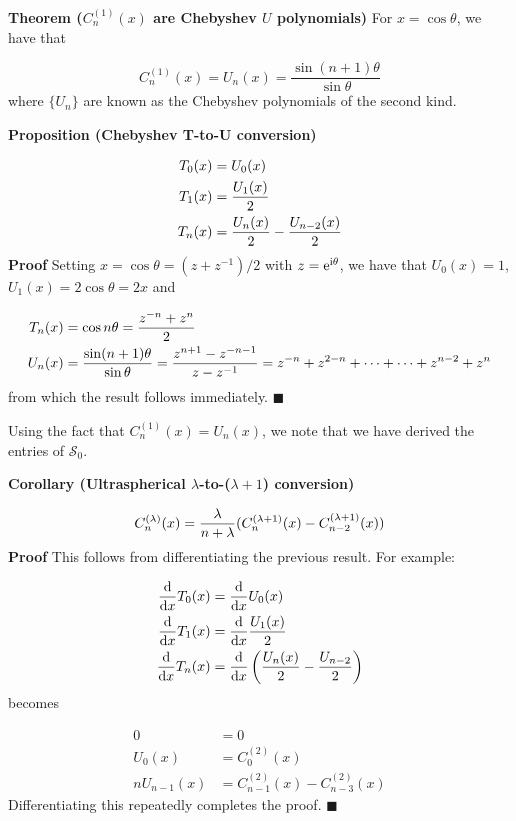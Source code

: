 \documentclass[12pt,landscape]{article}
\begin{document}
{\textbf{Theorem ($C^{(1)}_n(x)$ are Chebyshev $U$ polynomials)} For $x = \cos \theta$, we have that

\[
C_n^{(1)}(x) = U_n(x) = \frac{\sin (n+1)\theta}{\sin\theta}
\]
where $\{ U_n \}$ are known as the Chebyshev polynomials of the second kind.

\textbf{Proposition (Chebyshev T-to-U conversion)}


\begin{align*}
 T_0(x) &= U_0(x) \\
 T_1(x) &= {U_1(x) \over 2} \\
 T_n(x) &= {U_n(x) \over 2} - {U_{n-2}(x) \over 2}
\end{align*}
\textbf{Proof} Setting $x =\cos \theta = (z + z^{-1})/2$ with $z = {\rm e}^{{\rm i} \theta}$, we have that $U_0(x) = 1$, $U_1(x) = 2\cos\theta = 2x$ and


\begin{align*}
T_n(x) &= \cos n \theta = {z^{-n} + z^n \over 2}\\
U_n(x) &= {\sin (n+1) \theta \over \sin \theta} = {z^{n+1} - z^{-n-1} \over z - z^{-1}} = z^{-n} + z^{2-n} + \cdots +  \cdots + z^{n-2} + z^n
\end{align*}
from which the result follows immediately.  $\blacksquare$

Using the fact that $C_n^{(1)}(x) = U_n(x)$, we note that we have derived the entries of $\mathcal{S}_0$.

\textbf{Corollary (Ultraspherical $\lambda$-to-($\lambda+1$) conversion)}

\[
C_n^{(\lambda)}(x) = {\lambda \over n+ \lambda} (C_n^{(\lambda+1)}(x) - C_{n-2}^{(\lambda+1)}(x))
\]
\textbf{Proof} This follows from differentiating the previous result. For example:


\begin{align*}
 {{\rm d} \over {\rm d}x} T_0(x) &= {{\rm d} \over {\rm d}x} U_0(x) \\
 {{\rm d} \over {\rm d}x} T_1(x) &= {{\rm d} \over {\rm d}x} {U_1(x) \over 2} \\
{{\rm d} \over {\rm d}x} T_n(x) &= {{\rm d} \over {\rm d}x} \left({U_n(x) \over 2} - {U_{n-2} \over 2} \right)
\end{align*}
becomes


\begin{align*}
    0 &= 0\\
    U_0(x) &= C_0^{(2)}(x) \\
   n U_{n-1}(x) &= C_{n-1}^{(2)}(x)  - C_{n-3}^{(2)}(x)
\end{align*}
Differentiating this repeatedly completes the proof. $\blacksquare$

}
\end{document}
